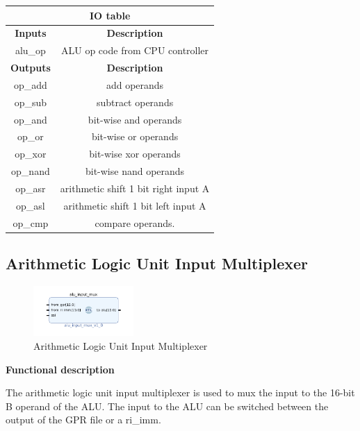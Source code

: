 \documentclass{article}
\begin{document}
\begin{par}
	\begin{center}
		\begin{tabular}{|c|c|}
			\hline 
			\multicolumn{2}{|c|}{\textbf{IO table}} \\
			\hline 
			\textbf{Inputs} & \textbf{Description} \\ 
			\hline 
			alu\_op & ALU op code from CPU controller \\ 
			\hline 
			\textbf{Outputs} & \textbf{Description} \\ 
			\hline 
			op\_add & add operands \\
			\hline
			op\_sub & subtract operands \\
			\hline
			op\_and & bit-wise and operands \\
			\hline
			op\_or & bit-wise or operands \\
			\hline
			op\_xor & bit-wise xor operands \\
			\hline
			op\_nand & bit-wise nand operands \\
			\hline
			op\_asr & arithmetic shift 1 bit right input A \\
			\hline
			op\_asl & arithmetic shift 1 bit left input A \\
			\hline
			op\_cmp & compare operands. \\
			\hline
		\end{tabular} 
	\end{center}

	\newpage
	
	\subsection{Arithmetic Logic Unit Input Multiplexer}
	
	\begin{figure}[H]
		\centering
		\includegraphics[width=1.5in]{img/aluMux.png}
		\caption{Arithmetic Logic Unit Input Multiplexer}
	\end{figure}
	
	\textbf{Functional description}
	\begin{par}
		The arithmetic logic unit input multiplexer is used to mux the input to the 16-bit B operand of the ALU. The input to the ALU can be switched between the output of the GPR file or a ri\_imm.
	\end{par}
	

\end{par}
\end{document}

